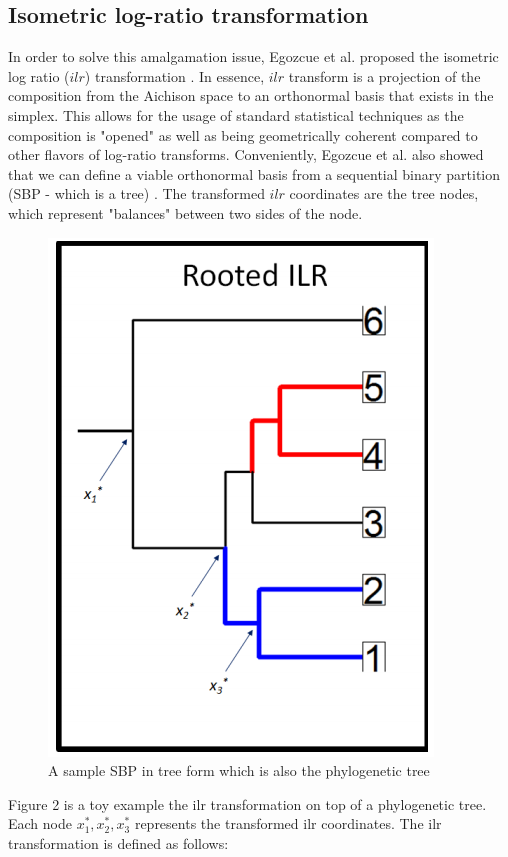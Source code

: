 \documentclass{article}
\begin{document}
\subsection{Isometric log-ratio transformation}
In order to solve this amalgamation issue, Egozcue et al. proposed the isometric log ratio ($ilr$) transformation \cite{egozcue2003}. In essence, $ilr$ transform is a projection of the composition from the Aichison space to an orthonormal basis that exists in the simplex. This allows for the usage of standard statistical techniques as the composition is "opened" as well as being geometrically coherent compared to other flavors of log-ratio transforms. Conveniently, Egozcue et al. also showed that we can define a viable orthonormal basis from a sequential binary partition (SBP - which is a tree) \cite{egozcue2003}. The transformed $ilr$ coordinates are the tree nodes, which represent "balances" between two sides of the node. 
\begin{figure}[!htb]
    \centering
    \includegraphics[scale = 0.5]{phylogeny_demonstration.png}
    \caption{A sample SBP in tree form which is also the phylogenetic tree}
    \label{fig:phylogeny_demonstration}
\end{figure}
Figure 2 is a toy example the ilr transformation on top of a phylogenetic tree. Each node $x_1^*, x_2^*, x_3^*$ represents the transformed ilr coordinates. The ilr transformation is defined as follows:
\end{document}
